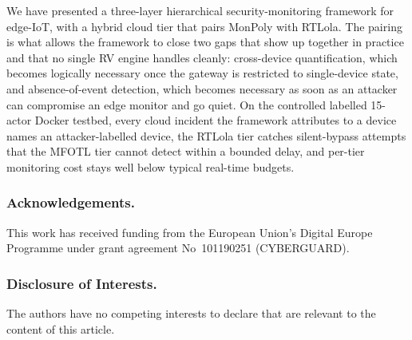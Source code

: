 \documentclass[runningheads]{llncs}
\begin{document}
We have presented a three-layer hierarchical security-monitoring
framework for edge-IoT, with a hybrid cloud tier that pairs
MonPoly with RTLola.  The pairing is what allows the framework
to close two gaps that show up together in practice and that no
single RV engine handles cleanly: cross-device quantification,
which becomes logically necessary once the gateway is
restricted to single-device state, and
absence-of-event detection, which becomes necessary as soon as
an attacker can compromise an edge monitor and go quiet.  On the controlled labelled 15-actor Docker testbed, every cloud incident the
framework attributes to a device names an attacker-labelled device, the
RTLola tier catches silent-bypass attempts that the MFOTL tier
cannot detect within a bounded delay, and per-tier monitoring cost stays well below typical
real-time budgets.

\subsubsection*{Acknowledgements.}
This work has received funding from the European Union's Digital Europe
Programme under grant agreement No~101190251 (CYBERGUARD).

{\small
\subsubsection*{Disclosure of Interests.}
The authors have no competing interests to declare that are relevant to the
content of this article.
}



\end{document}
